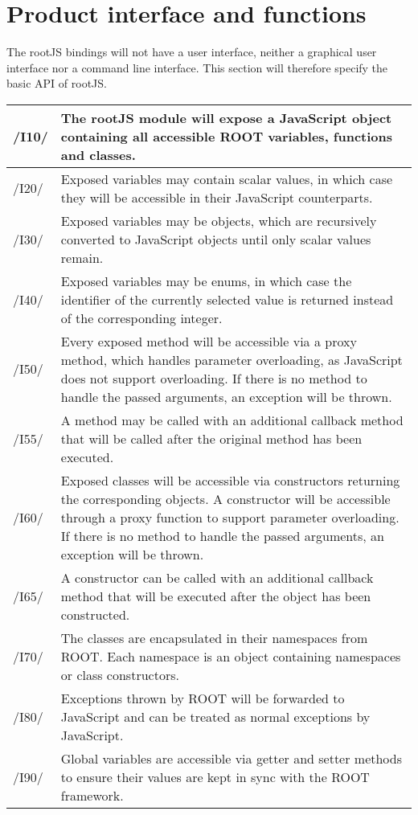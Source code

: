 \chapter{Product interface and functions}
The rootJS bindings will not have a user interface, neither a graphical user interface nor a command line interface.
This section will therefore specify the basic API of rootJS.


\begin{longtable}{|p{1cm} | p{15cm}|}
  \hline
  /I10/ & The rootJS module will expose a JavaScript object containing all accessible ROOT variables, functions and classes.\\
  \hline
  /I20/ & Exposed variables may contain scalar values, in which case they will be accessible in their JavaScript counterparts.\\
  \hline
  /I30/ & Exposed variables may be objects, which are recursively converted to JavaScript objects until only scalar values remain.\\
  \hline
  /I40/ & Exposed variables may be enums, in which case the identifier of the currently selected value is returned instead of the corresponding integer.\\
  \hline
  /I50/ & Every exposed method will be accessible via a proxy method, which handles parameter overloading, as JavaScript does not support overloading. If there is no method to handle the passed arguments, an exception will be thrown.\\
  \hline
  /I55/ & A method may be called with an additional callback method that will be called after the original method has been executed.\\
  \hline
  /I60/ & Exposed classes will be accessible via constructors returning the corresponding objects. A constructor will be accessible through a proxy function to support parameter overloading. If there is no method to handle the passed arguments, an exception will be thrown.\\
  \hline
  /I65/ & A constructor can be called with an additional callback method that will be executed after the object has been constructed.\\
  \hline
  /I70/ & The classes are encapsulated in their namespaces from ROOT. Each namespace is an object containing namespaces or class constructors.\\
  \hline
  /I80/ & Exceptions thrown by ROOT will be forwarded to JavaScript and can be treated as normal exceptions by JavaScript.\\
  \hline
  /I90/ & Global variables are accessible via getter and setter methods to ensure their values are kept in sync with the ROOT framework.\\
  \hline
\end{longtable}

